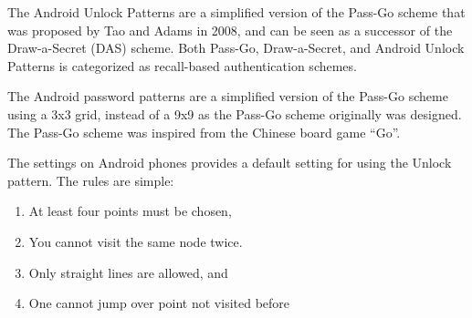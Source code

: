       The Android Unlock Patterns are a simplified version of the Pass-Go scheme that was proposed by Tao and Adams in 2008, and can be seen as a successor of the Draw-a-Secret (DAS) scheme. Both Pass-Go, Draw-a-Secret, and Android Unlock Patterns is categorized as recall-based authentication schemes.

      The Android password patterns are a simplified version of the Pass-Go scheme using a 3x3 grid, instead of a 9x9 as the Pass-Go scheme originally was designed. The Pass-Go scheme was inspired from the Chinese board game ``Go''.

      The settings on Android phones provides a default setting for using the Unlock pattern. 
      The rules are simple: 
          \begin{enumerate}
              \item At least four points must be chosen,
              \item You cannot visit the same node twice.
              \item Only straight lines are allowed, and
              \item One cannot jump over point not visited before
          \end{enumerate}
